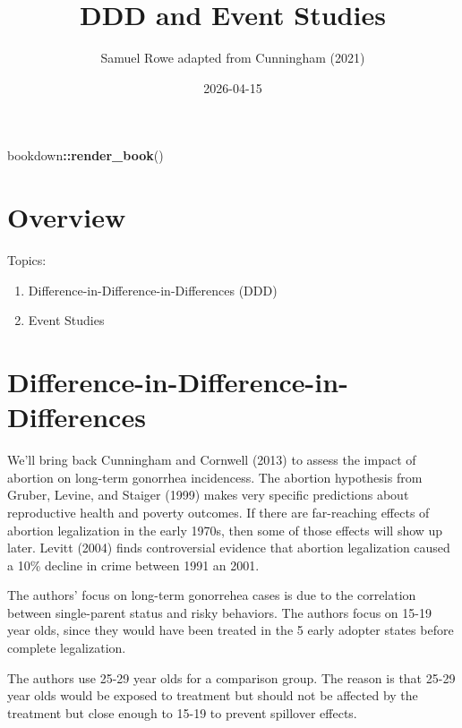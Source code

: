 \documentclass[
]{book}
\title{DDD and Event Studies}
\author{Samuel Rowe adapted from Cunningham (2021)}
\date{2026-04-15}
\newenvironment{Shaded}{\begin{snugshade}}{\end{snugshade}}
\newcommand{\FunctionTok}[1]{\textcolor[rgb]{0.13,0.29,0.53}{\textbf{#1}}}
\newcommand{\NormalTok}[1]{#1}
\newcommand{\SpecialCharTok}[1]{\textcolor[rgb]{0.81,0.36,0.00}{\textbf{#1}}}
\providecommand{\tightlist}{%
  \setlength{\itemsep}{0pt}\setlength{\parskip}{0pt}}
\begin{document}
\maketitle

{
\setcounter{tocdepth}{1}
\tableofcontents
}
\begin{Shaded}
\begin{Highlighting}[]
\NormalTok{bookdown}\SpecialCharTok{::}\FunctionTok{render\_book}\NormalTok{()}
\end{Highlighting}
\end{Shaded}

\chapter*{Overview}\label{overview}

Topics:

\begin{enumerate}
\def\labelenumi{\arabic{enumi}.}
\tightlist
\item
  Difference-in-Difference-in-Differences (DDD)
\item
  Event Studies
\end{enumerate}

\chapter{Difference-in-Difference-in-Differences}\label{difference-in-difference-in-differences}

We'll bring back Cunningham and Cornwell (2013) to assess the impact of abortion on long-term gonorrhea incidencess. The abortion hypothesis from Gruber, Levine, and Staiger (1999) makes very specific predictions about reproductive health and poverty outcomes. If there are far-reaching effects of abortion legalization in the early 1970s, then some of those effects will show up later. Levitt (2004) finds controversial evidence that abortion legalization caused a 10\% decline in crime between 1991 an 2001.

The authors' focus on long-term gonorrehea cases is due to the correlation between single-parent status and risky behaviors. The authors focus on 15-19 year olds, since they would have been treated in the 5 early adopter states before complete legalization.

The authors use 25-29 year olds for a comparison group. The reason is that 25-29 year olds would be exposed to treatment but should not be affected by the treatment but close enough to 15-19 to prevent spillover effects.
\end{document}
